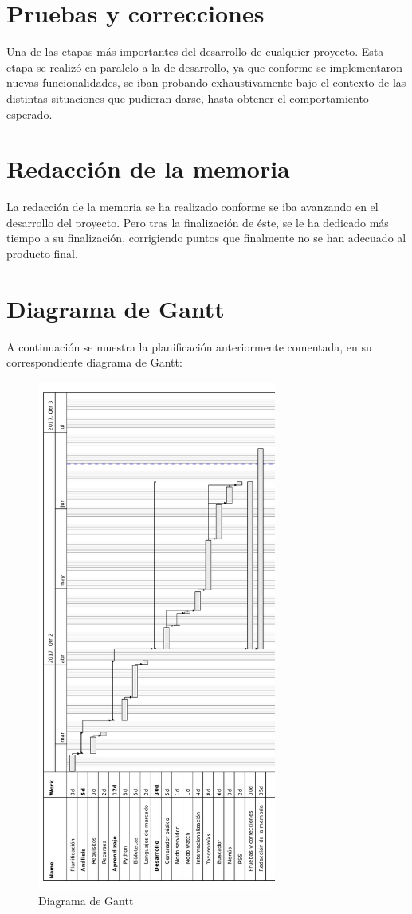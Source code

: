 \section{Pruebas y correcciones}

Una de las etapas más importantes del desarrollo de cualquier proyecto. Esta etapa se realizó en paralelo
a la de desarrollo, ya que conforme se implementaron nuevas funcionalidades, se iban probando exhaustivamente 
bajo el contexto de las distintas situaciones que pudieran darse, hasta obtener el comportamiento
esperado.

\section{Redacción de la memoria}

La redacción de la memoria se ha realizado conforme se iba avanzando en el desarrollo del proyecto.
Pero tras la finalización de éste, se le ha dedicado más tiempo a su finalización, corrigiendo puntos que
finalmente no se han adecuado al producto final.

\section{Diagrama de Gantt}

A continuación se muestra la planificación anteriormente comentada, en su correspondiente diagrama de
Gantt:


\begin{figure}[htbp]
    \centering
    \includegraphics[width=0.7\textwidth]{2_calendario/diagrama_gantt}
    \caption{Diagrama de Gantt}
    \label{fig:gantt}
\end{figure}
